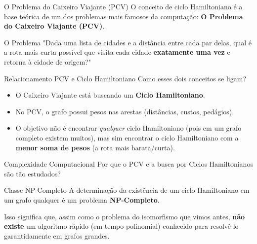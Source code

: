 \documentclass[9pt]{beamer}
\begin{document}
\begin{frame}{O Problema do Caixeiro Viajante (PCV)}
    O conceito de ciclo Hamiltoniano é a base teórica de um dos problemas mais famosos da computação: \textbf{O Problema do Caixeiro Viajante (PCV)}.
    \vspace{0.5cm}
    \begin{block}{O Problema}
        "Dada uma lista de cidades e a distância entre cada par delas, qual é a rota mais curta possível que visita cada cidade \textbf{exatamente uma vez} e retorna à cidade de origem?"
    \end{block}
\end{frame}

\begin{frame}{Relacionamento PCV e Ciclo Hamiltoniano}
    Como esses dois conceitos se ligam?
    \vspace{0.5cm}
    \begin{itemize}
        \item O Caixeiro Viajante está buscando um \textbf{Ciclo Hamiltoniano}.
        \item No PCV, o grafo possui pesos nas arestas (distâncias, custos, pedágios).
        \item O objetivo não é encontrar \textit{qualquer} ciclo Hamiltoniano (pois em um grafo completo existem muitos), mas sim encontrar o ciclo Hamiltoniano com a \textbf{menor soma de pesos} (a rota mais barata/curta).
    \end{itemize}
\end{frame}

\begin{frame}{Complexidade Computacional}
    Por que o PCV e a busca por Ciclos Hamiltonianos são tão estudados?
    \vspace{0.5cm}
    \begin{block}{Classe NP-Completo}
        A determinação da existência de um ciclo Hamiltoniano em um grafo qualquer é um problema \textbf{NP-Completo}.
    \end{block}
    \vspace{0.5cm}
    Isso significa que, assim como o problema do isomorfismo que vimos antes, \textbf{não existe} um algoritmo rápido (em tempo polinomial) conhecido para resolvê-lo garantidamente em grafos grandes.
\end{frame}
\end{document}
